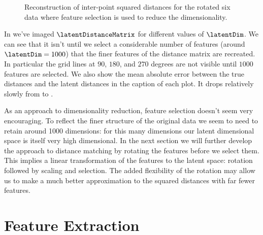 \begin{figure}
  \caption{Reconstruction of inter-point squared distances for the rotated six data where feature selection is used to reduce the dimensionality.}\label{fig:featureSelectionReconstruction}
\end{figure}
In
 we've imaged
$\latentDistanceMatrix$ for different values of $\latentDim$. We can
see that it isn't until we select a considerable number of features
(around $\latentDim=1000$) that the finer features of the distance
matrix are recreated. In particular the grid lines at $90$, $180$, and
$270$ degrees are not visible until $1000$ features are selected. We
also show the mean absolute error between the true distances and the
latent distances in the caption of each plot. It drops relatively
slowly from \errorVal{ }to \errorVal.

As an approach to dimensionality reduction, feature selection doesn't
seem very encouraging. To reflect the finer structure of the original
data we seem to need to retain around 1000 dimensions: for this many
dimensions our latent dimensional space is itself very high
dimensional. In the next section we will further develop the approach
to distance matching by rotating the features before we select
them. This implies a linear transformation of the features to the
latent space: rotation followed by scaling and selection. The added
flexibility of the rotation may allow us to make a much better
approximation to the squared distances with far fewer features.

\section{Feature Extraction}

